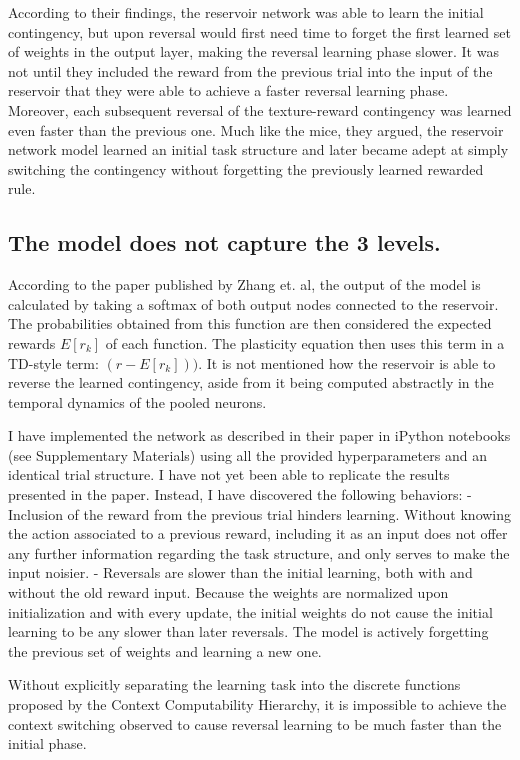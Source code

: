 \documentclass[]{article}
\begin{document}
According to their findings, the reservoir network was able to learn the initial contingency, but upon reversal would first need time to forget the first learned set of weights in the output layer, making the reversal learning phase slower.  It was not until they included the reward from the previous trial into the input of the reservoir that they were able to achieve a faster reversal learning phase.  Moreover, each subsequent reversal of the texture-reward contingency was learned even faster than the previous one.  Much like the mice, they argued, the reservoir network model learned an initial task structure and later became adept at simply switching the contingency without forgetting the previously learned rewarded rule.

\subsection{The model does not capture the 3 levels.}
According to the paper published by Zhang et. al, the output of the model is calculated by taking a softmax of both output nodes connected to the reservoir.  The probabilities obtained from this function are then considered the expected rewards $E[r_k]$ of each function.  The plasticity equation  then uses this term in a TD-style term: $(r - E[r_k]))$.  It is not mentioned how the reservoir is able to reverse the learned contingency, aside from it being computed abstractly in the temporal dynamics of the pooled neurons.

I have implemented the network as described in their paper in iPython notebooks (see Supplementary Materials) using all the provided hyperparameters and an identical trial structure.  I have not yet been able to replicate the results presented in the paper.  Instead, I have discovered the following behaviors:
- Inclusion of the reward from the previous trial hinders learning.  Without knowing the action associated to a previous reward, including it as an input does not offer any further information regarding the task structure, and only serves to make the input noisier.
- Reversals are slower than the initial learning, both with and without the old reward input.  Because the weights are normalized upon initialization and with every update, the initial weights do not cause the initial learning to be any slower than later reversals.  The model is actively forgetting the previous set of weights and learning a new one.

Without explicitly separating the learning task into the discrete functions proposed by the Context Computability Hierarchy, it is impossible to achieve the context switching observed to cause reversal learning to be much faster than the initial phase.
\end{document}
